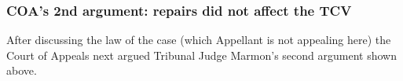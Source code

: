 \documentclass[12pt,\documentclassflag]{michiganCourtOfAppealsBrief}
\begin{document}


\subsubsection{COA's 2nd argument: repairs did not affect the TCV}

After discussing the law of the case (which Appellant is not appealing here) the Court of Appeals next argued Tribunal Judge Marmon's second argument shown above.
\end{document}
